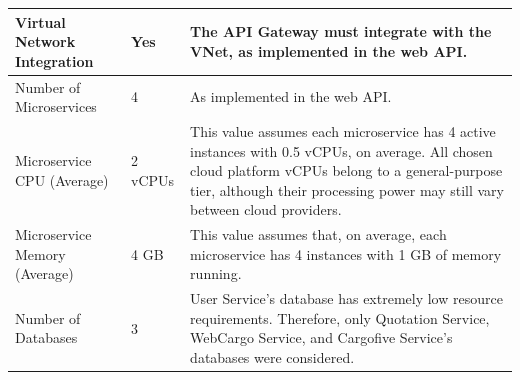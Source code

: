 \documentclass[12pt, reqno, oneside]{amsbook}
\theoremstyle{definition}
\theoremstyle{definition}
\numberwithin{section}{chapter}
\numberwithin{table}{chapter}
\numberwithin{figure}{chapter}
\begin{document}
\begin{longtable}{|M{70pt}|M{55pt}|m{300pt}|}
  \hline
  Virtual Network Integration
   & Yes
   & The \ac{API} Gateway must integrate with the \ac{VNet}, as implemented in the web \ac{API}.                                                                                                                                                                                                                                                                                                                                                                                         \\
  \hline
  Number of Microservices
   & 4
   & As implemented in the web \ac{API}.                                                                                                                                                                                                                                                                                                                                                                                                                                                 \\
  \hline
  Microservice CPU (Average)
   & 2 vCPUs
   & This value assumes each microservice has 4 active instances with 0.5 \acp{vCPU}, on average. All chosen cloud platform \acp{vCPU} belong to a general-purpose tier, although their processing power may still vary between cloud providers.                                                                                                                                                                                                                                         \\
  \hline
  Microservice Memory (Average)
   & 4 GB
   & This value assumes that, on average, each microservice has 4 instances with 1 \ac{GB} of memory running.                                                                                                                                                                                                                                                                                                                                                                            \\
  \hline
  Number of Databases
   & 3
   & User Service's database has extremely low resource requirements. Therefore, only Quotation Service, WebCargo Service, and Cargofive Service's databases were considered.                                                                                                                                                                                                                                                                                                            \\

\end{longtable}
\end{document}
